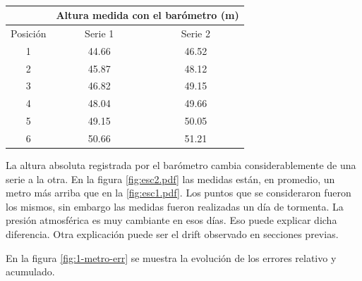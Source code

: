 \documentclass[main]{subfiles}
\begin{document}
\begin{table}
\vspace{-15pt}
\begin{tabular}{c|c|c|} 
	& \multicolumn{2}{|p{100pt}|}{\cellcolor[gray]{0.8} Altura medida con el barómetro (m)}      \\ \hline
\cellcolor[gray]{0.8} {Posición} & \cellcolor[gray]{0.8} {Serie 1} &\cellcolor[gray]{0.8} {Serie 2}\\ \hline

\multicolumn{1}{|c|}{1} & 44.66 & 46.52 \\ \hline
\multicolumn{1}{|c|}{2} & 45.87 & 48.12\\ \hline
\multicolumn{1}{|c|}{3} & 46.82 & 49.15\\ \hline
\multicolumn{1}{|c|}{4} & 48.04 & 49.66\\ \hline
\multicolumn{1}{|c|}{5} & 49.15 & 50.05\\ \hline
\multicolumn{1}{|c|}{6} & 50.66 & 51.21 \\ \hline

\end{tabular}
\caption{}
\label{tab:alturasm}
\end{table}

La altura absoluta registrada por el barómetro cambia considerablemente de una serie a la otra. En la figura \ref{fig:esc2.pdf} las medidas están, en promedio, un metro más arriba que en la \ref{fig:esc1.pdf}. Los puntos que se consideraron fueron los mismos, sin embargo las medidas fueron realizadas un día de tormenta. La presión atmosférica es muy cambiante en esos días. Eso puede explicar dicha diferencia. Otra explicación puede ser el drift observado en secciones previas.

En la figura \ref{fig:1-metro-err} se muestra la evolución de los errores relativo y acumulado.
\end{document}

